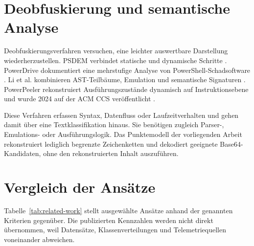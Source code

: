 \documentclass[12pt,a4paper,oneside,parskip=half]{scrreprt}
\begin{document}
\section{Deobfuskierung und semantische Analyse}
Deobfuskierungsverfahren versuchen, eine leichter auswertbare Darstellung wiederherzustellen. PSDEM verbindet statische und dynamische Schritte \cite{liu2018}. PowerDrive dokumentiert eine mehrstufige Analyse von PowerShell-Schadsoftware \cite{ugarte2019}. Li et al. kombinieren AST-Teilbäume, Emulation und semantische Signaturen \cite{li2019}. PowerPeeler rekonstruiert Ausführungszustände dynamisch auf Instruktionsebene und wurde 2024 auf der ACM CCS veröffentlicht \cite{li2024powerpeeler}.

Diese Verfahren erfassen Syntax, Datenfluss oder Laufzeitverhalten und gehen damit über eine Textklassifikation hinaus. Sie benötigen zugleich Parser-, Emulations- oder Ausführungslogik. Das Punktemodell der vorliegenden Arbeit rekonstruiert lediglich begrenzte Zeichenketten und dekodiert geeignete Base64-Kandidaten, ohne den rekonstruierten Inhalt auszuführen.
\section{Vergleich der Ansätze}
Tabelle~\ref{tab:related-work} stellt ausgewählte Ansätze anhand der genannten Kriterien gegenüber. Die publizierten Kennzahlen werden nicht direkt übernommen, weil Datensätze, Klassenverteilungen und Telemetriequellen voneinander abweichen.
\end{document}
